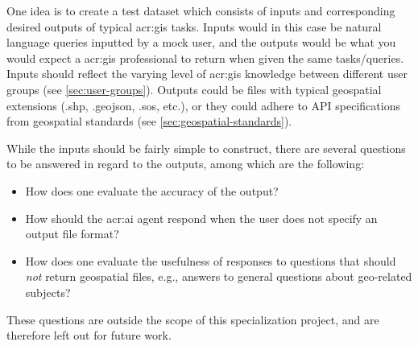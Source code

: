 One idea is to create a test dataset which consists of inputs and corresponding desired outputs of typical \acrshort{acr:gis} tasks. Inputs would in this case be natural language queries inputted by a mock user, and the outputs would be what you would expect a \acrshort{acr:gis} professional to return when given the same tasks/queries. Inputs should reflect the varying level of \acrshort{acr:gis} knowledge between different user groups (see \autoref{sec:user-groups}). Outputs could be files with typical geospatial extensions (.shp, .geojson, .sos, etc.), or they could adhere to API specifications from geospatial standards (see \autoref{sec:geospatial-standards}).

While the inputs should be fairly simple to construct, there are several questions to be answered in regard to the outputs, among which are the following:

\begin{itemize}
    \item How does one evaluate the accuracy of the output?
    \item How should the \acrshort{acr:ai} agent respond when the user does not specify an output file format?
    \item How does one evaluate the usefulness of responses to questions that should \textit{not} return geospatial files, e.g., answers to general questions about geo-related subjects?
\end{itemize}

\noindent These questions are outside the scope of this specialization project, and are therefore left out for future work.



\glsaddall